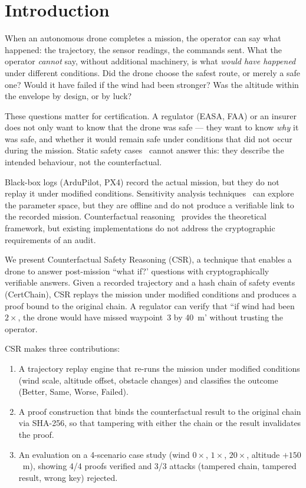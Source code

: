 ﻿\section{Introduction}

When an autonomous drone completes a mission, the operator can say
what happened: the trajectory, the sensor readings, the commands
sent. What the operator \emph{cannot} say, without additional
machinery, is what \emph{would have happened} under different
conditions. Did the drone choose the safest route, or merely a safe
one? Would it have failed if the wind had been stronger? Was the
altitude within the envelope by design, or by luck?

These questions matter for certification. A regulator (EASA, FAA)
or an insurer does not only want to know that the drone was safe —
they want to know \emph{why} it was safe, and whether it would
remain safe under conditions that did not occur during the mission.
Static safety cases~\cite{kelly1998} cannot answer this: they describe
the intended behaviour, not the counterfactual.

Black-box logs (ArduPilot, PX4) record the actual mission, but they
do not replay it under modified conditions. Sensitivity analysis
techniques~\cite{saltelli2008} can explore the parameter space, but
they are offline and do not produce a verifiable link to the
recorded mission. Counterfactual reasoning~\cite{pearl2009} provides
the theoretical framework, but existing implementations do not
address the cryptographic requirements of an audit.

We present Counterfactual Safety Reasoning (CSR), a technique that
enables a drone to answer post-mission ``what if?' questions with
cryptographically verifiable answers. Given a recorded trajectory
and a hash chain of safety events (CertChain), CSR replays the
mission under modified conditions and produces a proof bound to the
original chain. A regulator can verify that ``if wind had been
$2\times$, the drone would have missed waypoint~3 by 40~m' without
trusting the operator.

CSR makes three contributions:

\begin{enumerate}
    \item A trajectory replay engine that re-runs the mission under
          modified conditions (wind scale, altitude offset, obstacle
          changes) and classifies the outcome (Better, Same, Worse,
          Failed).
    \item A proof construction that binds the counterfactual result
          to the original chain via SHA-256, so that tampering with
          either the chain or the result invalidates the proof.
    \item An evaluation on a 4-scenario case study (wind $0\times$,
          $1\times$, $20\times$, altitude $+150$~m), showing 4/4
          proofs verified and 3/3 attacks (tampered chain, tampered
          result, wrong key) rejected.
\end{enumerate}

